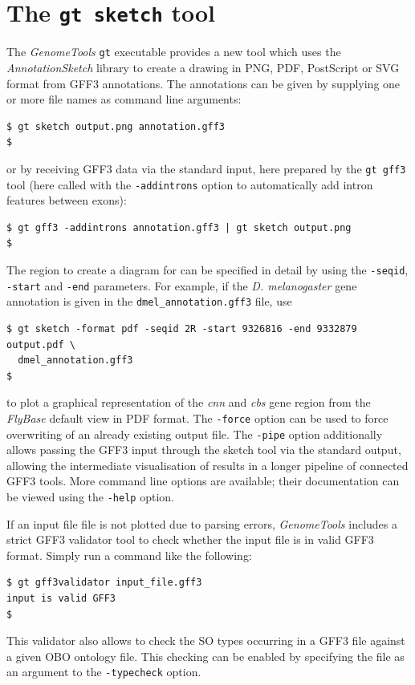 \documentclass[a4paper]{scrreprt}
\begin{document}
\section{The \texttt{gt sketch} tool}

The \emph{GenomeTools} \texttt{gt} executable provides a new tool which uses the \emph{AnnotationSketch} library to create a drawing in PNG, PDF, PostScript or SVG format from GFF3 annotations. The annotations can be given by supplying one or more file names as command line arguments:
\small
\begin{verbatim}
$ gt sketch output.png annotation.gff3
$
\end{verbatim}
\normalsize
or by receiving GFF3 data via the standard input, here prepared by the \texttt{gt gff3} tool (here called with the \texttt{-addintrons} option to automatically add intron features between exons):
\small
\begin{verbatim}
$ gt gff3 -addintrons annotation.gff3 | gt sketch output.png
$
\end{verbatim}
\normalsize
The region to create a diagram for can be specified in detail by using the \texttt{-seqid}, \texttt{-start} and \texttt{-end} parameters. For example, if the \emph{D. melanogaster} gene annotation is given in the \texttt{dmel\_annotation.gff3} file, use
\small
\begin{verbatim}
$ gt sketch -format pdf -seqid 2R -start 9326816 -end 9332879 output.pdf \
  dmel_annotation.gff3
$
\end{verbatim}
\normalsize
to plot a graphical representation of the \emph{cnn} and \emph{cbs} gene region from the \emph{FlyBase} default view in PDF format.
The \texttt{-force} option can be used to force overwriting of an already existing output file. The \texttt{-pipe} option additionally allows passing the GFF3 input through the sketch tool via the standard output, allowing the intermediate visualisation of results in a longer pipeline of connected GFF3 tools. More command line options are available; their documentation can be viewed using the \texttt{-help} option.

If an input file file is not plotted due to parsing errors, \emph{GenomeTools} includes a strict GFF3 validator tool to check whether the input file is in valid GFF3 format. Simply run a command like the following:
\small
\begin{verbatim}
$ gt gff3validator input_file.gff3
input is valid GFF3
$
\end{verbatim}
\normalsize
This validator also allows to check the SO types occurring in a GFF3 file against a given OBO ontology file. This checking can be enabled by specifying the file as an argument to the \texttt{-typecheck} option.
\end{document}

